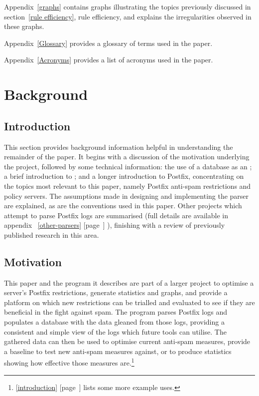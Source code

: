 \documentclass[a4paper,12pt,draft]{article}
\newcommand{\refwithpage}[1]{%
    \empty{}\ref{#1} [page~\pageref{#1}]%
}
\newcommand{\sectionref}[1]{%
    \textsection{}\refwithpage{#1}%
}
\begin{document}
Appendix~\ref{graphs} contains graphs illustrating the topics previously
discussed in section~\ref{rule efficiency}, rule efficiency, and explains
the irregularities observed in these graphs.

Appendix~\ref{Glossary} provides a glossary of terms used in the paper.

Appendix~\ref{Acronyms} provides a list of acronyms used in the paper.

\section{Background}

\label{background}

\subsection{Introduction}

This section provides background information helpful in understanding the
remainder of the paper.  It begins with a discussion of the motivation
underlying the project, followed by some technical information: the use of
a database as an \API{}\@; a brief introduction to
 \SMTP{}\@; and a longer introduction to
Postfix, concentrating on the topics most relevant to this paper, namely
Postfix anti-spam restrictions and policy servers.  The assumptions made in
designing and implementing the parser are explained, as are the conventions
used in this paper.  Other projects which attempt to parse Postfix logs are
summarised (full details are available in
appendix~\refwithpage{other-parsers}), finishing with a review of
previously published research in this area.

\subsection{Motivation}

This paper and the program it describes are part of a larger project to
optimise a server's Postfix restrictions, generate statistics and graphs,
and provide a platform on which new restrictions can be trialled and
evaluated to see if they are beneficial in the fight against spam.  The
program parses Postfix logs and populates a database with the data gleaned
from those logs, providing a consistent and simple view of the logs which
future tools can utilise.  The gathered data can then be used to optimise
current anti-spam measures, provide a baseline to test new anti-spam
measures against, or to produce statistics showing how effective those
measures are.\footnote{\sectionref{introduction} lists some more example
uses.}
\end{document}
